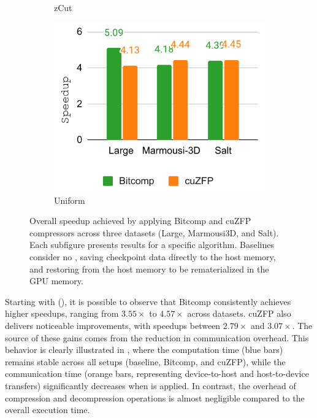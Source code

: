 \documentclass[Ingles]{ic-tese-v3}
\begin{document}
\begin{figure}[h!]
\begin{subfigure}[b]{0.33\textwidth}
        \caption{zCut}
        \label{fig:compress_speedup_zcut}
    \end{subfigure}
    \hfill
    \begin{subfigure}[b]{0.32\textwidth}
        \includegraphics[width=\textwidth]{figures/compress_speedup/speedup_compress_uniform.pdf}
        \caption{Uniform}
        \label{fig:compress_speedup_uniform}
    \end{subfigure}
    
    \caption[Overall speedup (\compression)]{Overall speedup achieved by applying Bitcomp and cuZFP compressors across three datasets (Large, Marmousi3D, and Salt). Each subfigure presents results for a specific \checkpointing algorithm. Baselines consider no \compression, saving checkpoint data directly to the host memory, and restoring from the host memory to be rematerialized in the GPU memory.}
    
    \label{fig:compress_speedup}
\end{figure}

Starting with \revolve (), it is possible to observe that Bitcomp consistently achieves higher speedups, ranging from $3.55\times$ to $4.57\times$ across datasets. cuZFP also delivers noticeable improvements, with speedups between $2.79\times$ and $3.07\times$. The source of these gains comes from the reduction in communication overhead. This behavior is clearly illustrated in , where the computation time (blue bars) remains stable across all setups (baseline, Bitcomp, and cuZFP), while the communication time (orange bars, representing device-to-host and host-to-device transfers) significantly decreases when \compression is applied. In contrast, the overhead of compression and decompression operations is almost negligible compared to the overall execution time.
\end{document}
